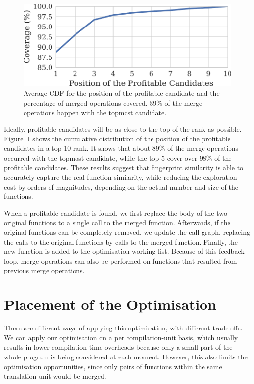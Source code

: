 \begin{figure}[t!]
  \centering
  \includegraphics[width=0.8\linewidth]{src/merging-optimisation/figs/average-cdf-exploration-threshold.pdf}
  \caption{Average CDF for the position of the profitable candidate and the percentage of merged operations covered.
           89\% of the merge operations happen with the topmost candidate.}
  \label{fig:average-cdf-exploration-threshold}
\end{figure}

Ideally, profitable candidates will be as close to the top of the rank as
possible.
Figure~\ref{fig:average-cdf-exploration-threshold} shows the cumulative
distribution of the position of the profitable candidates in a top 10 rank.
It shows that about 89\% of the merge operations occurred with the topmost
candidate, while the top 5 cover over 98\% of the profitable candidates.
These results suggest that fingerprint similarity is able to
accurately capture the real function similarity, while reducing the exploration
cost by orders of magnitudes, depending on the actual number and size of
the functions.

When a profitable candidate is found, we first replace the body of the two
original functions to a single call to the merged function.
Afterwards, if the original functions can be completely removed, we update the
call graph, replacing the calls to the original functions by calls to the
merged function.
Finally, the new function is added to the optimisation working list.
Because of this feedback loop, merge operations can also be performed on
functions that resulted from previous merge operations.

\section{Placement of the Optimisation}

There are different ways of applying this optimisation, with different trade-offs.
We can apply our optimisation on a per compilation-unit basis, which usually
results in lower compilation-time overheads because only a small part of the
whole program is being considered at each moment.
However, this also limits the optimisation opportunities, since only pairs of
functions within the same translation unit would be merged.

